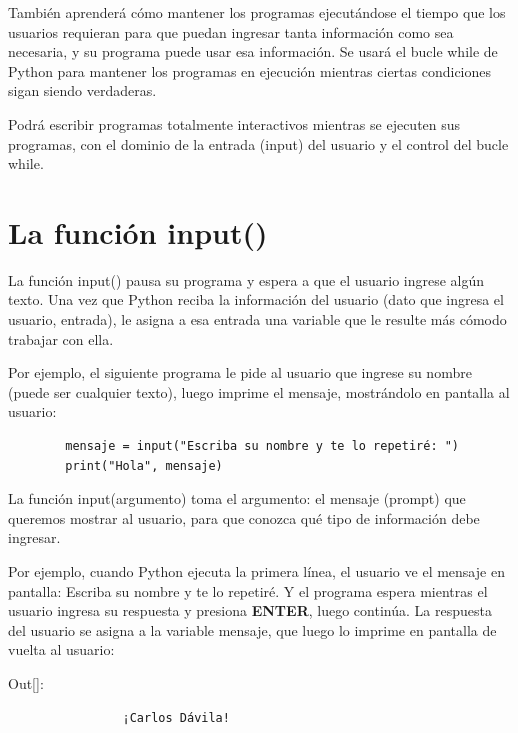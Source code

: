	También aprenderá cómo mantener los programas ejecutándose el tiempo que los usuarios requieran  para que puedan ingresar tanta información como sea necesaria, y su programa puede usar esa información. Se usará el bucle {\ttfamily while} de Python para mantener los programas en ejecución mientras ciertas condiciones sigan siendo verdaderas.
	
	Podrá escribir programas totalmente interactivos mientras se ejecuten sus programas, con el dominio de la entrada ({\ttfamily input}) del usuario y el control del bucle {\ttfamily while}. 
	
	
	\section{La función input()}
	
	La función {\ttfamily input()} pausa su programa y espera a que el usuario ingrese
	algún texto. Una vez que Python reciba la información  del usuario  (dato que ingresa el usuario, entrada), le asigna  a esa entrada una
	variable que le resulte más cómodo trabajar con ella.
	
	Por ejemplo, el siguiente programa le pide al usuario que ingrese su nombre (puede ser cualquier texto),
	luego imprime el  mensaje, mostrándolo en pantalla al usuario:
	
	\hspace{-2.5cm}{\ttfamily \scriptsize usuario.py}\vspace{-0.5cm}
	\begin{lstlisting}		
		mensaje = input("Escriba su nombre y te lo repetiré: ")	
		print("Hola", mensaje)
	\end{lstlisting}	
	
	La función {\ttfamily input(argumento)} toma el argumento: el mensaje ({\ttfamily prompt}) que queremos
	mostrar al usuario, para que  conozca  qué tipo de información debe ingresar. 
	
	Por ejemplo, cuando Python ejecuta la primera línea, el usuario ve el mensaje en pantalla:
	{\ttfamily Escriba su nombre y te lo repetiré}. Y el programa espera mientras el usuario ingresa su respuesta y presiona {\bf ENTER}, luego continúa. La respuesta del usuario se asigna a la variable {\ttfamily mensaje}, que luego lo imprime en pantalla de vuelta al usuario:
	
	{\ttfamily\scriptsize\scriptsize 
		\hspace{-0.65cm} Out[]:\vspace{-0.3cm}	
		{\color{blue} 	
			\begin{verbatim}
				¡Carlos Dávila!
			\end{verbatim}
	}}
	
